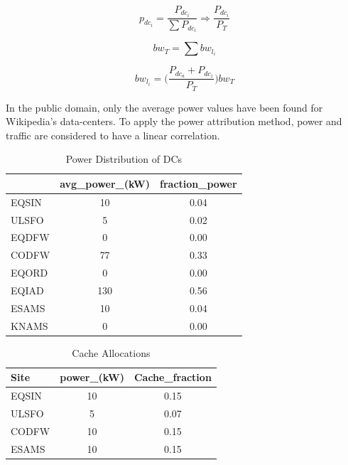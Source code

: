 \documentclass[conference]{IEEEtran}
\begin{document}
\begin{equation}
p_{dc_i}=\frac{P_{dc_i}}{\sum{P_{dc_i}}} \Rightarrow \frac{P_{dc_i}}{P_{T}}\label{eq:percentage}
\end{equation}

\begin{equation}
bw_{T}=\sum{bw_{l_i}}\label{eq:total_network}
\end{equation}

\begin{equation}
bw_{l_i}=\Big(\frac{P_{dc_a} + P_{dc_z}}{P_{T}}\Big){bw_{T}} \label{eq:link_percentage}
\end{equation}

In the public domain, only the average power values have been found for Wikipedia's data-centers. To apply the power attribution method, power and traffic are considered to have a linear correlation. 

\begin{table}[htbp]
\caption{Power Distribution of DCs}
\begin{center}
\begin{tabular}{lcc}
\hline
{} &  avg\_power\_(kW)  & fraction\_power \\
\hline
EQSIN &              10 &           0.04 \\
ULSFO &               5 &           0.02 \\
EQDFW &               0 &           0.00 \\
CODFW &              77 &           0.33 \\
EQORD &               0 &           0.00 \\
EQIAD &             130 &           0.56 \\
ESAMS &              10 &           0.04 \\
KNAMS &               0 &           0.00 \\
\hline
\end{tabular}
\label{power_dist}
\end{center}
\end{table}

\begin{table}[htbp]
\caption{Cache Allocations}
\begin{center}
\begin{small}
\begin{tabular}{lcc}
\hline
Site &  power\_(kW) & Cache\_fraction \\
\hline
EQSIN &          10 &           0.15 \\
ULSFO &           5 &           0.07 \\
CODFW &          10 &           0.15 \\
ESAMS &          10 &           0.15 \\
\hline
\end{tabular}
\label{link_alloc}
\end{small}
\end{center}
\end{table}
\end{document}
